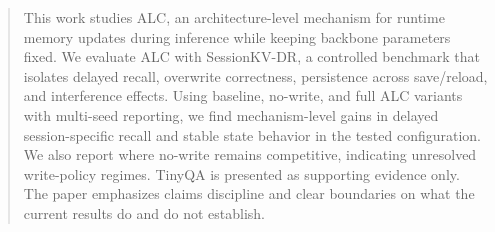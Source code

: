 \begin{abstract}
This work studies ALC, an architecture-level mechanism for runtime memory updates during inference while keeping backbone parameters fixed. We evaluate ALC with SessionKV-DR, a controlled benchmark that isolates delayed recall, overwrite correctness, persistence across save/reload, and interference effects. Using baseline, no-write, and full ALC variants with multi-seed reporting, we find mechanism-level gains in delayed session-specific recall and stable state behavior in the tested configuration. We also report where no-write remains competitive, indicating unresolved write-policy regimes. TinyQA is presented as supporting evidence only. The paper emphasizes claims discipline and clear boundaries on what the current results do and do not establish.
\end{abstract}
